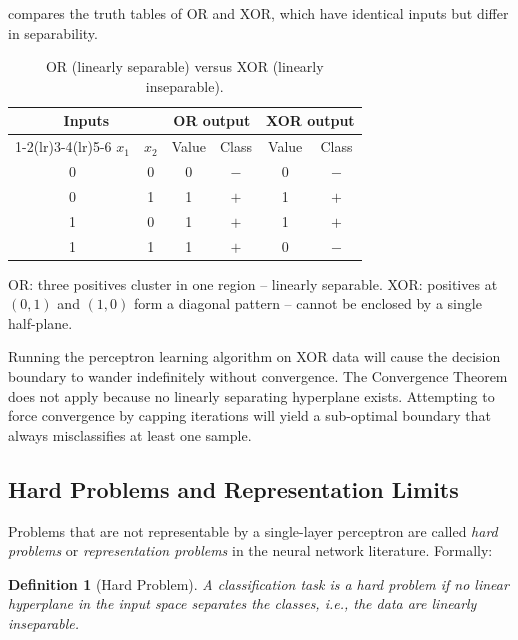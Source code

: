 \documentclass[12pt,a4paper]{article}
\newtheorem{definition}{Definition}[section]
\begin{document}
 compares the truth tables of OR and XOR, which have
identical inputs but differ in separability.

\begin{table}[ht]
\centering
\caption{OR (linearly separable) versus XOR (linearly inseparable).}
\label{tab:xor-vs-or}
\begin{tabular}{cc cc cc}
\toprule
\multicolumn{2}{c}{\textbf{Inputs}} & \multicolumn{2}{c}{\textbf{OR output}} & \multicolumn{2}{c}{\textbf{XOR output}} \\
\cmidrule(lr){1-2}\cmidrule(lr){3-4}\cmidrule(lr){5-6}
$x_1$ & $x_2$ & Value & Class & Value & Class \\
\midrule
0 & 0 & 0 & $-$ & 0 & $-$ \\
0 & 1 & 1 & $+$ & 1 & $+$ \\
1 & 0 & 1 & $+$ & 1 & $+$ \\
1 & 1 & 1 & $+$ & 0 & $-$ \\
\bottomrule
\end{tabular}

\vspace{4pt}
\small OR: three positives cluster in one region -- linearly separable.
XOR: positives at $(0,1)$ and $(1,0)$ form a diagonal pattern -- cannot
be enclosed by a single half-plane.
\end{table}

\begin{warningbox}[title=Warning -- Single Perceptron Cannot Solve XOR]
Running the perceptron learning algorithm on XOR data will cause the
decision boundary to wander indefinitely without convergence.  The
Convergence Theorem does not apply because no linearly separating
hyperplane exists.  Attempting to force convergence by capping iterations
will yield a sub-optimal boundary that always misclassifies at least one
sample.
\end{warningbox}

\subsection{Hard Problems and Representation Limits}
\label{subsec:hard-problems}

Problems that are not representable by a single-layer perceptron are
called \emph{hard problems} or \emph{representation problems} in the
neural network literature.  Formally:

\begin{definition}[Hard Problem]
\label{def:hard-problem}
A classification task is a \emph{hard problem} if no linear hyperplane
in the input space separates the classes, i.e., the data are
\emph{linearly inseparable}.
\end{definition}
\end{document}
